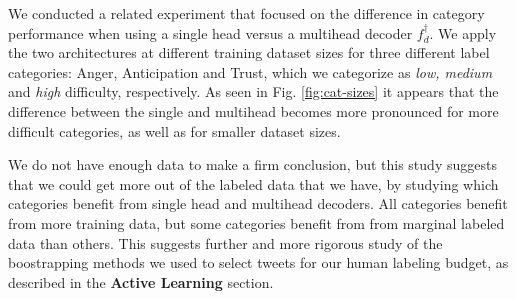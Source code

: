 \documentclass[letterpaper]{article} %
\begin{document}
We conducted a related experiment that focused on the difference in category performance when using a single head versus a multihead decoder $f_d^{\dagger}$. We apply the two architectures at different training dataset sizes  for three different label categories: Anger, Anticipation and Trust, which we categorize as \textit{low, medium} and \textit{high} difficulty, respectively. As seen in Fig. \ref{fig:cat-sizes} it appears that the difference between the single and multihead becomes more pronounced for more difficult categories, as well as for smaller dataset sizes. 

We do not have enough data to make a firm conclusion, but this study suggests that we could get more out of the labeled data that we have, by studying which categories benefit from single head and multihead decoders. All categories benefit from more training data, but some categories benefit from from marginal labeled data than others. This suggests further and more rigorous study of the boostrapping methods we used to select tweets for our human labeling budget, as described in the \textbf{Active Learning} section.
\end{document}
